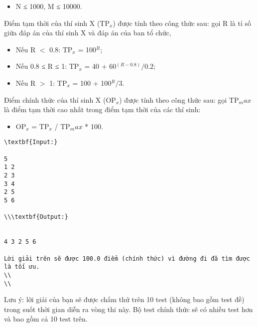 \begin{itemize}
	\item N ≤ 1000, M ≤ 10000.
\end{itemize}
Điểm tạm thời của thí sinh X (TP$_x$) được tính theo công thức sau: gọi R là tỉ số giữa đáp án của thí sinh X và đáp án của ban tổ chức,
\begin{itemize}
	\item Nếu R $<$ 0.8: TP$_x$ = 100$^R$;
	\item Nếu 0.8 ≤ R ≤ 1: TP$_x$ = 40 + 60$^(R - 0.8) / 0.2$;
	\item Nếu R $>$ 1: TP$_x$ = 100 + 100$^R / 3$.
\end{itemize}

Điểm chính thức của thí sinh X (OP$_x$) được tính theo công thức sau: gọi TP$_max$ là điểm tạm thời cao nhất trong điểm tạm thời của các thí sinh:
\begin{itemize}
	\item OP$_x$ = TP$_x$ / TP$_max$ * 100.
\end{itemize}
\begin{verbatim}
\textbf{Input:}

5
1 2
2 3
3 4
2 5
5 6

\\\textbf{Output:}


4 3 2 5 6 

Lời giải trên sẽ được 100.0 điểm (chính thức) vì đường đi đã tìm được là tối ưu. 
\\
\\\end{verbatim}

Lưu ý: lời giải của bạn sẽ được chấm thử trên 10 test (không bao gồm test đề) trong suốt thời gian diễn ra vòng thi này. Bộ test chính thức sẽ có nhiều test hơn và bao gồm cả 10 test trên.